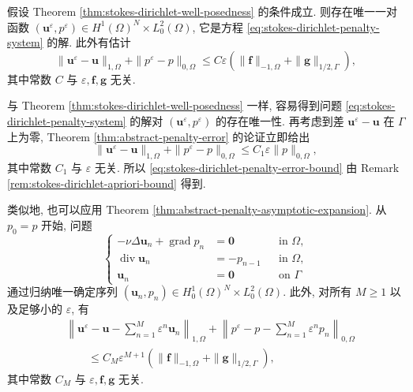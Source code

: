 \setcounter{statement}{2}
\begin{Theorem}\label{thm:stokes-dirichlet-penalty-error}
假设 Theorem \ref{thm:stokes-dirichlet-well-posedness} 的条件成立.
则存在唯一一对函数
$(\mathbf{u}^\varepsilon,p^\varepsilon)
\in H^1(\Omega)^N\times L_0^2(\Omega)$,
它是方程 \eqref{eq:stokes-dirichlet-penalty-system} 的解. 此外有估计
\begin{equation}\label{eq:stokes-dirichlet-penalty-error-bound}
\|\mathbf{u}^\varepsilon-\mathbf{u}\|_{1,\Omega}
+\|p^\varepsilon-p\|_{0,\Omega}
\le
C\varepsilon
(\|\mathbf{f}\|_{-1,\Omega}
+\|\mathbf{g}\|_{1/2,\Gamma}),
\end{equation}
其中常数 $C$ 与 $\varepsilon,\mathbf{f},\mathbf{g}$ 无关.
\end{Theorem}
\begin{Proof}
与 Theorem \ref{thm:stokes-dirichlet-well-posedness} 一样,
容易得到问题 \eqref{eq:stokes-dirichlet-penalty-system}
的解对 $(\mathbf{u}^\varepsilon,p^\varepsilon)$ 的存在唯一性.
再考虑到差
$\mathbf{u}^\varepsilon-\mathbf{u}$ 在 $\Gamma$ 上为零,
Theorem \ref{thm:abstract-penalty-error} 的论证立即给出
\[
\|\mathbf{u}^\varepsilon-\mathbf{u}\|_{1,\Omega}
+\|p^\varepsilon-p\|_{0,\Omega}
\le C_1\varepsilon\|p\|_{0,\Omega},
\]
其中常数 $C_1$ 与 $\varepsilon$ 无关.
所以 \eqref{eq:stokes-dirichlet-penalty-error-bound}
由 Remark \ref{rem:stokes-dirichlet-apriori-bound} 得到.
\end{Proof}

类似地, 也可以应用 Theorem
\ref{thm:abstract-penalty-asymptotic-expansion}. 从 $p_0=p$ 开始,
问题
\begin{equation}\label{eq:stokes-dirichlet-asymptotic-recursion}
\left\{
\begin{aligned}
-\nu\Delta\mathbf{u}_n+\operatorname{grad}p_n
&=\mathbf{0}
&&\text{in }\Omega,\\
\operatorname{div}\mathbf{u}_n&=-p_{n-1}
&&\text{in }\Omega,\\
\mathbf{u}_n&=\mathbf{0}
&&\text{on }\Gamma
\end{aligned}
\right.
\end{equation}
通过归纳唯一确定序列
$(\mathbf{u}_n,p_n)\in H_0^1(\Omega)^N\times L_0^2(\Omega)$.
此外, 对所有 $M\ge1$ 以及足够小的 $\varepsilon$, 有
\begin{equation}\label{eq:stokes-dirichlet-asymptotic-error}
\begin{aligned}
&\left\|
\mathbf{u}^\varepsilon-\mathbf{u}
-\sum_{n=1}^{M}\varepsilon^n\mathbf{u}_n
\right\|_{1,\Omega}
+\left\|
p^\varepsilon-p
-\sum_{n=1}^{M}\varepsilon^np_n
\right\|_{0,\Omega}\\
&\qquad\le
C_M\varepsilon^{M+1}
(\|\mathbf{f}\|_{-1,\Omega}
+\|\mathbf{g}\|_{1/2,\Gamma}),
\end{aligned}
\end{equation}
其中常数 $C_M$ 与 $\varepsilon,\mathbf{f},\mathbf{g}$ 无关.

